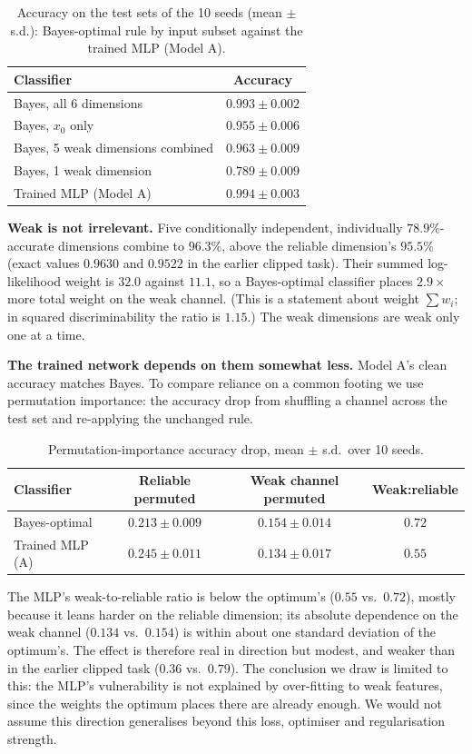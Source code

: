 \documentclass[11pt]{article}
\begin{document}
\begin{table}[h]
\centering
\caption{Accuracy on the test sets of the 10 seeds (mean $\pm$ s.d.): Bayes-optimal rule by input
subset against the trained MLP (Model A).}
\label{tab:bayes}
\begin{tabular}{lc}
\toprule
Classifier & Accuracy \\
\midrule
Bayes, all 6 dimensions & $0.993\pm0.002$ \\
Bayes, $x_0$ only & $0.955\pm0.006$ \\
Bayes, 5 weak dimensions combined & $0.963\pm0.009$ \\
Bayes, 1 weak dimension & $0.789\pm0.009$ \\
\midrule
Trained MLP (Model A) & $0.994\pm0.003$ \\
\bottomrule
\end{tabular}
\end{table}

\textbf{Weak is not irrelevant.} Five conditionally independent, individually
$78.9\%$-accurate dimensions combine to $96.3\%$, above the reliable dimension's
$95.5\%$ (exact values $0.9630$ and $0.9522$ in the earlier clipped task). Their summed
log-likelihood weight is $32.0$ against $11.1$, so a Bayes-optimal classifier places $2.9\times$ more
total weight on the weak channel. (This is a statement about weight $\sum w_i$; in squared
discriminability the ratio is $1.15$.) The weak dimensions are weak only one at a time.

\textbf{The trained network depends on them somewhat less.} Model A's clean accuracy matches
Bayes. To compare reliance on a common footing we use permutation importance: the accuracy drop from
shuffling a channel across the test set and re-applying the unchanged rule.

\begin{table}[h]
\centering
\caption{Permutation-importance accuracy drop, mean $\pm$ s.d.\ over 10 seeds.}
\label{tab:perm}
\begin{tabular}{lccc}
\toprule
Classifier & Reliable permuted & Weak channel permuted & Weak:reliable \\
\midrule
Bayes-optimal & $0.213\pm0.009$ & $0.154\pm0.014$ & $0.72$ \\
Trained MLP (A) & $0.245\pm0.011$ & $0.134\pm0.017$ & $0.55$ \\
\bottomrule
\end{tabular}
\end{table}

The MLP's weak-to-reliable ratio is below the optimum's ($0.55$ vs.\ $0.72$), mostly because it
leans harder on the reliable dimension; its absolute dependence on the weak channel ($0.134$ vs.\
$0.154$) is within about one standard deviation of the optimum's. The effect is therefore real in
direction but modest, and weaker than in the earlier clipped task ($0.36$ vs.\ $0.79$). The
conclusion we draw is limited to this: the MLP's vulnerability is not explained by
over-fitting to weak features, since the weights the optimum places there are already enough. We would not assume this
direction generalises beyond this loss, optimiser and regularisation strength.
\end{document}
